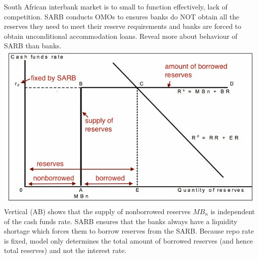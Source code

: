\documentclass[12pt]{examnotes}
\begin{document}
\ra South African interbank market is to small to function effectively, lack of competition.
\ra SARB conducts OMOs to ensures banks do NOT obtain all the reserves they need to meet their reserve requirements and banks are forced to obtain unconditional accommodation loans. Reveal more about behaviour of SARB than banks.
\includegraphics[scale=0.5]{./imgs/166.jpg}
\ra Vertical (AB) shows that the supply of nonborrowed reserves $MB_n$ is independent of the cash funds rate.
\ra SARB ensures that the banks always have a liquidity shortage which forces them to borrow reserves from the SARB.
\ra Because repo rate is fixed, model only determines the total amount of borrowed reserves (and hence total reserves) and not the interest rate.
\end{document}
